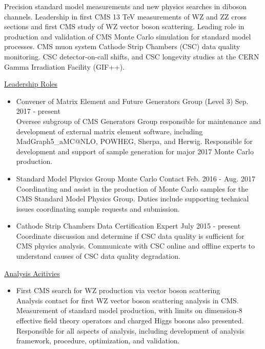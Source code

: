 \documentclass[10pt]{res} %
\begin{document}
\begin{resume}
Precision standard model measurements and new physics searches in diboson channels. Leadership in
first CMS 13 TeV measurements of WZ and ZZ cross sections and first CMS study of WZ vector boson scattering.
Leading role in production and validation of CMS Monte Carlo simulation for standard model
processes. CMS muon system Cathode Strip Chambers (CSC) data quality monitoring.
CSC detector-on-call shifts, and CSC longevity studies at the
CERN Gamma Irradiation Facility (GIF++).

\underline{Leadership Roles}
\vspace{2mm}
\begin{itemize}
  \item{Convener of Matrix Element and Future Generators Group (Level 3) \hfill{Sep. 2017 - present}} \\
    Oversee subgroup of CMS Generators Group
    responsible for maintenance and development of external matrix element software, 
    including MadGraph5\_aMC@NLO, POWHEG, Sherpa, and Herwig. Responsible for development and support of sample generation for
    major 2017 Monte Carlo production.
  \item{Standard Model Physics Group Monte Carlo Contact \hfill{Feb. 2016 - Aug. 2017}} \\
    Coordinating and assist 
    in the production of Monte Carlo samples for the CMS Standard Model Physics Group. 
    Duties include supporting technical issues coordinating sample requests and submission.
  \item{Cathode Strip Chambers Data Certification Expert \hfill{July 2015 - present}} \\
    Coordinate discussion and determine if
    CSC data quality is sufficient for CMS physics analysis.
    Communicate with CSC online and offline experts to understand
    causes of CSC data quality degradation.
\end{itemize}

\underline{Analysis Acitivies}
\vspace{2mm}
\begin{itemize}
  \item{First CMS search for WZ production via vector boson scattering}\\
    Analysis contact for first WZ vector boson scattering analysis in CMS. 
    Measurement of standard model production, with limits on dimension-8 
    effective field theory operators and charged Higgs bosons also presented.
    Responsible for all aspects of analysis, 
    including development of analysis framework, procedure, optimization, and validation. 


\end{itemize}
\end{resume}
\end{document}
